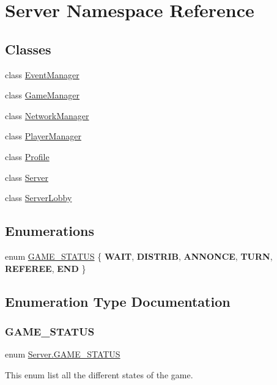 \hypertarget{namespace_server}{}\section{Server Namespace Reference}
\label{namespace_server}
\subsection*{Classes}
\begin{DoxyCompactItemize}
\item 
class \hyperlink{class_server_1_1_event_manager}{Event\+Manager}
\item 
class \hyperlink{class_server_1_1_game_manager}{Game\+Manager}
\item 
class \hyperlink{class_server_1_1_network_manager}{Network\+Manager}
\item 
class \hyperlink{class_server_1_1_player_manager}{Player\+Manager}
\item 
class \hyperlink{class_server_1_1_profile}{Profile}
\item 
class \hyperlink{class_server_1_1_server}{Server}
\item 
class \hyperlink{class_server_1_1_server_lobby}{Server\+Lobby}
\end{DoxyCompactItemize}
\subsection*{Enumerations}
\begin{DoxyCompactItemize}
\item 
enum \hyperlink{namespace_server_a2b496a25969b5c46d373f7079fac645f}{G\+A\+M\+E\+\_\+\+S\+T\+A\+T\+US} \{ \newline
{\bfseries W\+A\+IT}, 
{\bfseries D\+I\+S\+T\+R\+IB}, 
{\bfseries A\+N\+N\+O\+N\+CE}, 
{\bfseries T\+U\+RN}, 
\newline
{\bfseries R\+E\+F\+E\+R\+EE}, 
{\bfseries E\+ND}
 \}
\end{DoxyCompactItemize}


\subsection{Enumeration Type Documentation}
\mbox{\label{namespace_server_a2b496a25969b5c46d373f7079fac645f}} 
\subsubsection{\texorpdfstring{G\+A\+M\+E\+\_\+\+S\+T\+A\+T\+US}{GAME\_STATUS}}
{\footnotesize\ttfamily enum \hyperlink{namespace_server_a2b496a25969b5c46d373f7079fac645f}{Server.\+G\+A\+M\+E\+\_\+\+S\+T\+A\+T\+US}\hspace{0.3cm}{\ttfamily [strong]}}

This enum list all the different states of the game. 
